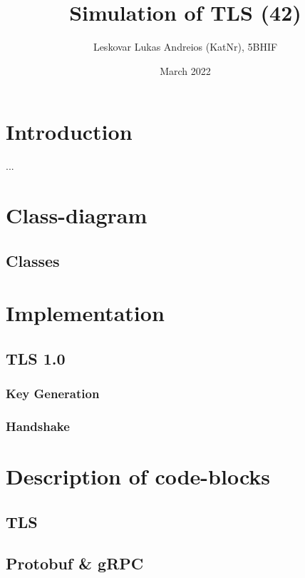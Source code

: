 \documentclass[12pt, letterpaper]{article}
\title{Simulation of TLS (42)}
\author{Leskovar Lukas Andreios (KatNr), 5BHIF}
\date{March 2022}
\begin{document}
\begin{titlepage}
\maketitle
\end{titlepage}

\tableofcontents
\newpage

\section{Introduction}
...

\section{Class-diagram}


\subsection{Classes}


\section{Implementation}


\subsection{TLS 1.0}


\subsubsection{Key Generation}


\subsubsection{Handshake}


\section{Description of code-blocks}


\subsection{TLS}


\subsection{Protobuf \& gRPC}
\end{document}
